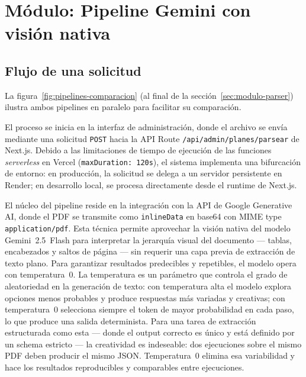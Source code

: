 \documentclass[12pt, a4paper]{report}
\begin{document}
\section{Módulo: Pipeline Gemini con visión nativa}
\label{sec:modulo-gemini}

\subsection{Flujo de una solicitud}

La figura~\ref{fig:pipelines-comparacion} (al final de la sección~\ref{sec:modulo-parser})
ilustra ambos pipelines en paralelo para facilitar su comparación.

El proceso se inicia en la interfaz de administración, donde el archivo se envía mediante
una solicitud \texttt{POST} hacia la API Route \texttt{/api/admin/planes/parsear} de
Next.js. Debido a las limitaciones de tiempo de ejecución de las funciones
\textit{serverless} en Vercel (\texttt{maxDuration: 120s}), el sistema implementa una
bifurcación de entorno: en producción, la solicitud se delega a un servidor persistente en
Render; en desarrollo local, se procesa directamente desde el runtime de Next.js.

El núcleo del pipeline reside en la integración con la API de Google Generative AI, donde
el PDF se transmite como \texttt{inlineData} en base64 con MIME type
\texttt{application/pdf}. Esta técnica permite aprovechar la visión nativa del modelo
Gemini~2.5~Flash para interpretar la jerarquía visual del documento --- tablas, encabezados
y saltos de página --- sin requerir una capa previa de extracción de texto plano. Para
garantizar resultados predecibles y repetibles, el modelo opera con temperatura~0. La
temperatura es un parámetro que controla el grado de aleatoriedad en la generación de
texto: con temperatura alta el modelo explora opciones menos probables y produce respuestas
más variadas y creativas; con temperatura~0 selecciona siempre el token de mayor
probabilidad en cada paso, lo que produce una salida determinista. Para una tarea de
extracción estructurada como esta --- donde el output correcto es único y está definido por
un schema estricto --- la creatividad es indeseable: dos ejecuciones sobre el mismo PDF
deben producir el mismo JSON. Temperatura~0 elimina esa variabilidad y hace los resultados
reproducibles y comparables entre ejecuciones.
\end{document}
